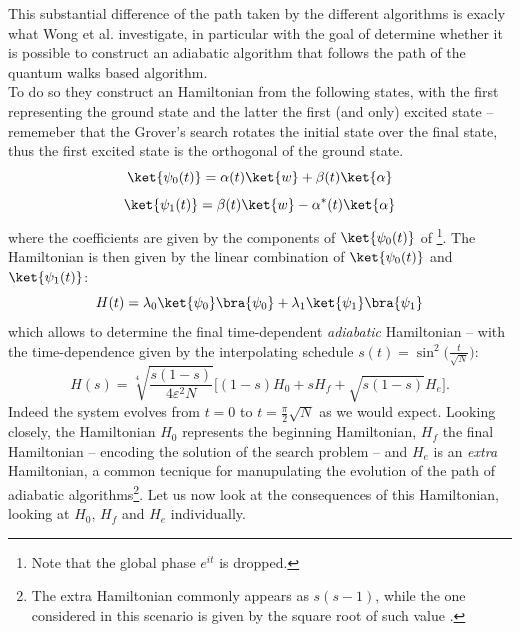 \noindent
This substantial difference of the path taken by the different algorithms is exacly what Wong et al. investigate, in particular with the goal of determine whether it is possible to construct an adiabatic algorithm that follows the path of the quantum walks based algorithm. \\

\noindent
To do so they construct an Hamiltonian from the following states, with the first representing the ground state and the latter the first (and only) excited state -- rememeber that the Grover's search rotates the initial state over the final state, thus the first excited state is the orthogonal of the ground state.
\begin{equation}
  \ket{\psi_0(t)} = \alpha(t)\ket{w} + \beta(t)\ket{\alpha}
\end{equation}
\vspace{-0.5cm}
\begin{equation}
  \ket{\psi_1(t)} = \beta(t)\ket{w} - \alpha^*(t)\ket{\alpha}
\end{equation}
where the coefficients are given by the components of $\ket{\psi_0(t)}$ of  \footnote{Note that the global phase $e^{it}$ is dropped.}.
The Hamiltonian is then given by the linear combination of $\ket{\psi_0(t)}$ and $\ket{\psi_1(t)}$:
\begin{equation}
  H(t) = \lambda_0\ket{\psi_0}\bra{\psi_0} + \lambda_1\ket{\psi_1}\bra{\psi_1}
\end{equation}
which allows to determine the final time-dependent \textit{adiabatic} Hamiltonian -- with the time-dependence given by the interpolating schedule $s(t)=\sin^2\big(\frac{t}{\sqrt{N}}\big)$:
\begin{equation}
  H(s) = \sqrt[4]{\frac{s(1-s)}{4\varepsilon^2N}}\Big[ (1-s)H_0 + sH_f + \sqrt{s(1-s)}H_e\Big].
\end{equation}
Indeed the system evolves from $t=0$ to $t=\frac{\pi}{2}\sqrt{N}$ as we would expect. Looking closely, the Hamiltonian $H_0$ represents the beginning Hamiltonian, $H_f$ the final Hamiltonian -- encoding the solution of the search problem -- and $H_e$ is an \textit{extra} Hamiltonian, a common tecnique for manupulating the evolution of the path of adiabatic algorithms\footnote{The extra Hamiltonian commonly appears as $s(s-1)$, while the one considered in this scenario is given by the square root of such value \cite{Wong2016}.}. Let us now look at the consequences of this Hamiltonian, looking at $H_0$, $H_f$ and $H_e$ individually. \\
